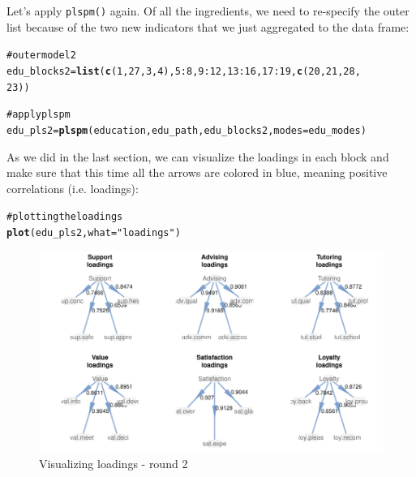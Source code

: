 \documentclass[12pt]{book}\usepackage{graphicx, color}
\makeatletter
\newcommand{\hlfunctioncall}[1]{\textcolor[rgb]{0.501960784313725,0,0.329411764705882}{\textbf{#1}}}%
\newcommand{\hlstring}[1]{\textcolor[rgb]{0.6,0.6,1}{#1}}%
\newcommand{\hlcomment}[1]{\textcolor[rgb]{0.180392156862745,0.6,0.341176470588235}{#1}}%
\newenvironment{kframe}{%
 \def\at@end@of@kframe{}%
 \ifinner\ifhmode%
  \def\at@end@of@kframe{\end{minipage}}%
  \begin{minipage}{\columnwidth}%
 \fi\fi%
 \def\FrameCommand##1{\hskip\@totalleftmargin \hskip-\fboxsep
 \colorbox{shadecolor}{##1}\hskip-\fboxsep
     \hskip-\linewidth \hskip-\@totalleftmargin \hskip\columnwidth}%
 \MakeFramed {\advance\hsize-\width
   \@totalleftmargin\z@ \linewidth\hsize
   \@setminipage}}%
 {\par\unskip\endMakeFramed%
 \at@end@of@kframe}
\newenvironment{knitrout}{}{} %
\newcommand{\fplspm}{\texttt{plspm()}}
\makeatother
\begin{document}
Let's apply \fplspm{} again. Of all the ingredients, we need to re-specify the outer list because of the two new indicators that we just aggregated to the data frame:
\begin{knitrout}
\color{fgcolor}\begin{kframe}
\begin{alltt}
\hlcomment{# outer model 2}
edu_blocks2 = \hlfunctioncall{list}(\hlfunctioncall{c}(1, 27, 3, 4), 5:8, 9:12, 13:16, 17:19, \hlfunctioncall{c}(20, 21, 28, 
    23))

\hlcomment{# apply plspm}
edu_pls2 = \hlfunctioncall{plspm}(education, edu_path, edu_blocks2, modes = edu_modes)
\end{alltt}
\end{kframe}
\end{knitrout}


As we did in the last section, we can visualize the loadings in each block and make sure that this time all the arrows are colored in blue, meaning positive correlations (i.e. loadings):
\begin{knitrout}
\color{fgcolor}\begin{kframe}
\begin{alltt}
\hlcomment{# plotting the loadings}
\hlfunctioncall{plot}(edu_pls2, what = \hlstring{"loadings"})
\end{alltt}
\end{kframe}\begin{figure}[h]


{\centering \includegraphics[width=1\linewidth,height=.6\linewidth]{figure/edu_pls2_loadings_plot} 

}

\caption[Visualizing loadings - round 2]{Visualizing loadings - round 2\label{fig:edu_pls2_loadings_plot}}
\end{figure}


\end{knitrout}
\end{document}
